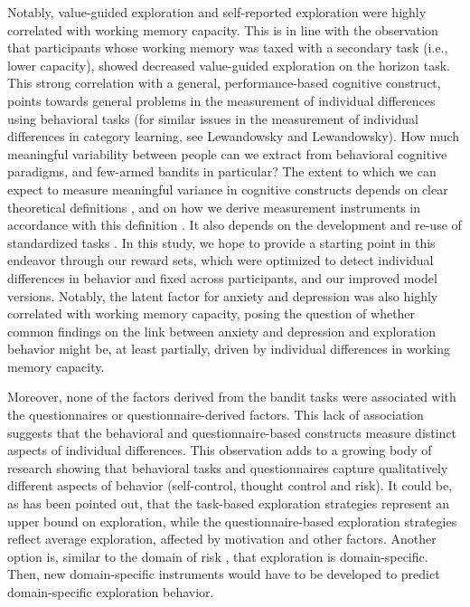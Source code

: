 \documentclass[fleqn,10pt]{wlscirep}
\begin{document}
Notably, value-guided exploration and self-reported exploration were highly correlated with working memory capacity. This is in line with the observation that participants whose working memory was taxed with a secondary task (i.e., lower capacity), showed decreased value-guided exploration on the horizon task\cite{cogliati_dezza_should_2019}. This strong correlation with a general, performance-based cognitive construct, points towards general problems in the measurement of individual differences using behavioral tasks (for similar issues in the measurement of individual differences in category learning, see Lewandowsky\cite{lewandowsky_working_2011} and Lewandowsky\cite{lewandowsky_working_2012}). How much meaningful variability between people can we extract from behavioral cognitive paradigms, and few-armed bandits in particular? The extent to which we can expect to measure meaningful variance in cognitive constructs depends on clear theoretical definitions \cite{bringmann_back_2022}, and on how we derive measurement instruments in accordance with this definition \cite{oberauer_meaning_2024}. It also depends on the development and re-use of standardized tasks \cite{elson_psychological_2023}. In this study, we hope to provide a starting point in this endeavor through our reward sets, which were optimized to detect individual differences in behavior and fixed across participants, and our improved model versions. Notably, the latent factor for anxiety and depression was also highly correlated with working memory capacity, posing the question of whether common findings on the link between anxiety and depression and exploration behavior\cite{fan_trait_2023, aberg_2022, blanco_2013, smith_lower_2022} might be, at least partially, driven by individual differences in working memory capacity.

Moreover, none of the factors derived from the bandit tasks were associated with the questionnaires or questionnaire-derived factors. This lack of association suggests that the behavioral and questionnaire-based constructs measure distinct aspects of individual differences. This observation adds to a growing body of research showing that behavioral tasks and questionnaires capture qualitatively different aspects of behavior\cite{dang_why_2020} (self-control\cite{duckworth_meta-analysis_2011, moffitt_gradient_2011}, thought control \cite{gobel_meta-analytic_2022} and risk\cite{frey_risk_2017}). It could be, as has been pointed out\cite{dang_why_2020}, that the task-based exploration strategies represent an upper bound on exploration, while the questionnaire-based exploration strategies reflect average exploration, affected by motivation and other factors. Another option is, similar to the domain of risk \cite{blais_domain-specific_2006}, that exploration is domain-specific. Then, new domain-specific instruments would have to be developed to predict domain-specific exploration behavior.
\end{document}

